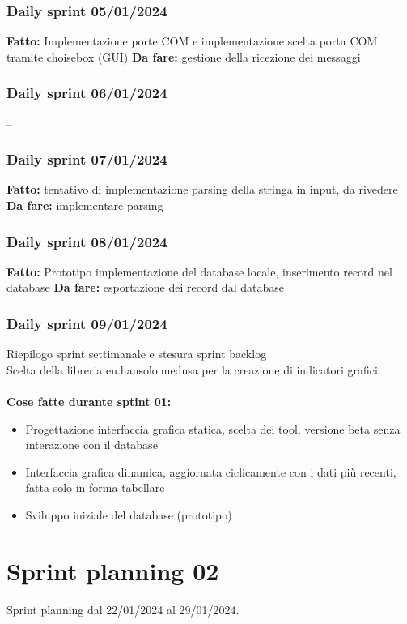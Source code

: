 \documentclass{report}
\begin{document}
\subsection{Daily sprint 05/01/2024}
\textbf{Fatto:} Implementazione porte COM e implementazione scelta porta COM tramite choisebox (GUI)
\textbf{Da fare:} gestione della ricezione dei messaggi
\subsection{Daily sprint 06/01/2024}
--
\subsection{Daily sprint 07/01/2024}
\textbf{Fatto:} tentativo di implementazione parsing della stringa in input, da rivedere
\textbf{Da fare:} implementare parsing
\subsection{Daily sprint 08/01/2024}
\textbf{Fatto:} Prototipo implementazione del database locale, inserimento record nel database
\textbf{Da fare:} esportazione dei record dal database
\subsection{Daily sprint 09/01/2024}
Riepilogo sprint settimanale e stesura sprint backlog\\
Scelta della libreria eu.hansolo.medusa per la creazione di indicatori grafici.\\\\

\textbf{Cose fatte durante sptint 01:}
\begin{itemize}
\item Progettazione interfaccia grafica statica, scelta dei tool, versione beta senza interazione con il database
\item Interfaccia grafica dinamica, aggiornata ciclicamente con i dati più recenti, fatta solo in forma tabellare
\item Sviluppo iniziale del database (prototipo)
\end{itemize}

\chapter{Sprint planning 02}
Sprint planning dal 22/01/2024 al 29/01/2024.\\
\end{document}
